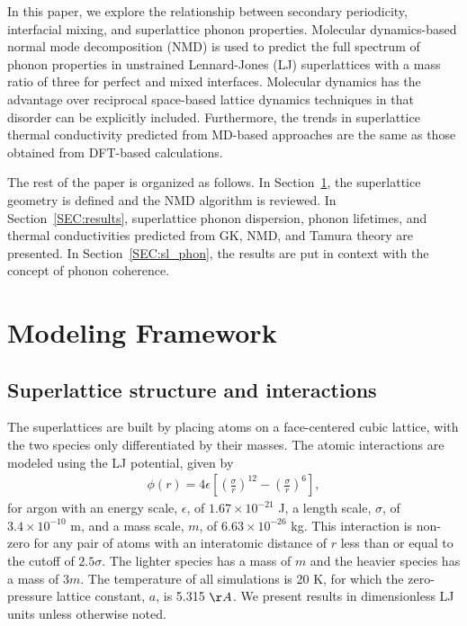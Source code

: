 \documentclass[aps,prb,preprint,preprintnumbers,amsmath,amssymb,floatfix,superscriptaddress]{revtex4}
\begin{document}
In this paper, we explore the relationship between secondary periodicity, interfacial mixing, and superlattice phonon properties. Molecular dynamics-based normal mode decomposition (NMD) is used to predict the full spectrum of phonon properties in unstrained Lennard-Jones (LJ) superlattices with a mass ratio of three for perfect and mixed interfaces. Molecular dynamics has the advantage over reciprocal space-based lattice dynamics techniques in that disorder can be explicitly included. Furthermore, the trends in superlattice thermal conductivity predicted from MD-based approaches are the same as those obtained from DFT-based calculations.\cite{PhysRevB.79.075316,PhysRevB.72.174302,doi:10.1021/nl202186y,PhysRevB.87.140302,Luckyanova16112012} 

The rest of the paper is organized as follows. In Section~\ref{SEC:modeling}, the superlattice geometry is defined and the NMD algorithm is reviewed. In Section~\ref{SEC:results}, superlattice phonon dispersion, phonon lifetimes, and thermal conductivities predicted from GK, NMD, and Tamura theory are presented. In Section~\ref{SEC:sl_phon}, the results are put in context with the concept of phonon coherence.

\section{Modeling Framework}\label{SEC:modeling}
\subsection{Superlattice structure and interactions}\label{SEC:sl_struc}
The superlattices are built by placing atoms on a face-centered cubic lattice, with the two species only differentiated by their masses. {\color{red}The atomic interactions are modeled using the LJ potential, given by
\begin{equation}\label{EQ:LJpot}
\begin{split}
\phi(r)=4\epsilon\left[ \left (\frac{\sigma}{r} \right)^{12}-\left (\frac{\sigma}{r} \right)^6 \right],
\end{split}
\end{equation}
for argon with an energy scale, $\epsilon$, of $1.67\times10^{-21}$ J, a length scale, $\sigma$, of $3.4\times10^{-10}$ m, and a mass scale, $m$, of $6.63\times10^{-26}$ kg. This interaction is non-zero for any pair of atoms with an interatomic distance of $r$ less than or equal to the cutoff of $2.5\sigma$.} The lighter species has a mass of $m$ and the heavier species has a mass of $3m$. The temperature of all simulations is 20 K, for which the zero-pressure lattice constant, $a$, is 5.315 $\AA$.\cite{PhysRevB.69.094303} We present results in dimensionless LJ units unless otherwise noted. 
\end{document}
